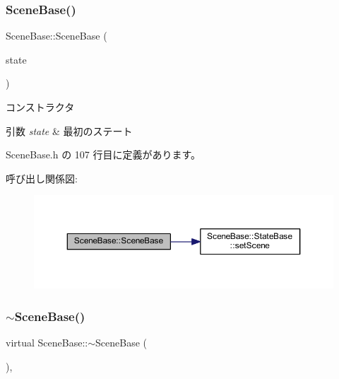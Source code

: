 \subsubsection{\texorpdfstring{Scene\+Base()}{SceneBase()}}
{\footnotesize\ttfamily Scene\+Base\+::\+Scene\+Base (\begin{DoxyParamCaption}\item[{\mbox{\hyperlink{class_scene_base_1_1_state_base}{State\+Base}} $\ast$}]{state }\end{DoxyParamCaption})\hspace{0.3cm}{\ttfamily [inline]}}



コンストラクタ 


\begin{DoxyParams}{引数}
{\em state} & 最初のステート \\
\hline
\end{DoxyParams}


 Scene\+Base.\+h の 107 行目に定義があります。

呼び出し関係図\+:
\nopagebreak
\begin{figure}[H]
\begin{center}
\leavevmode
\includegraphics[width=350pt]{class_scene_base_aeafd60485ad8b2191f40da3013d50f2c_cgraph}
\end{center}
\end{figure}
\mbox{\label{class_scene_base_a187dd160e5a16909bcc6529851e38318}} 
\subsubsection{\texorpdfstring{$\sim$\+Scene\+Base()}{~SceneBase()}}
{\footnotesize\ttfamily virtual Scene\+Base\+::$\sim$\+Scene\+Base (\begin{DoxyParamCaption}{ }\end{DoxyParamCaption})\hspace{0.3cm}{\ttfamily [inline]}, {\ttfamily [virtual]}}



